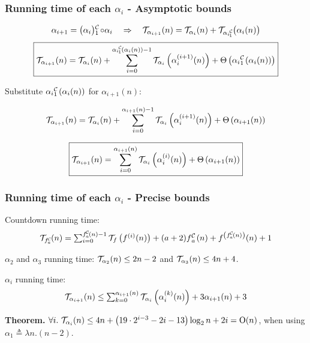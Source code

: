 \begin{frame}
\frametitle{Running time of each $\alpha_i$ - Asymptotic bounds}

\begin{equation*}
\alpha_{i+1} = \cdt{\big(\alpha_i\big)}{1}\circ \alpha_i
\quad \implies \quad \runtime_{\alpha_{i+1}}(n) = \runtime_{\alpha_i}(n) + \runtime_{\cdt{\alpha_i}{1}}\big(\alpha_i(n)\big)
\end{equation*}
\begin{equation*}
\boxed{
	\runtime_{\alpha_{i+1}}(n) = \runtime_{\alpha_i}(n) + 
\sum_{i=0}^{\cdt{\alpha_i}{1}(\alpha_i(n)) - 1} \runtime_{\alpha_i}\left(\alpha_i^{(i+1)}(n)\right) + \Theta\left(\cdt{\alpha_i}{1}(\alpha_i(n)) \right)
}
\end{equation*}

Substitute $\cdt{\alpha_i}{1}(\alpha_i(n))$ for $\alpha_{i+1}(n)$:

\begin{equation*}
\mathcal{T}_{\alpha_{i+1}}(n)
  = \mathcal{T}_{\alpha_i}(n) + 
  \sum_{i=0}^{\alpha_{i+1}(n) - 1} \mathcal{T}_{\alpha_i}\left(\alpha_i^{(i+1)}(n)\right) + \Theta\left(\alpha_{i+1}(n) \right)
\end{equation*}

\begin{equation*}
\boxed{\mathcal{T}_{\alpha_{i+1}}(n)
	= \sum_{i=0}^{\alpha_{i+1}(n)} \mathcal{T}_{\alpha_i}\left(\alpha_i^{(i)}(n)\right) + \Theta\left(\alpha_{i+1}(n) \right)}
\end{equation*}

\end{frame}


\begin{frame}
\frametitle{Running time of each $\alpha_i$ - Precise bounds}

Countdown running time:
\begin{equation*}
\textstyle \runtime_{\cdt{f}{a}}(n) =
\sum_{i=0}^{\cdt{f}{a}(n) - 1} \runtime_f\left(f^{(i)}(n)\right)
+ (a + 2)\cdt{f}{a}(n) + f^{\left(\cdt{f}{a}(n)\right)}(n) + 1
\end{equation*}

\smallskip

$\alpha_2$ and $\alpha_3$ running time: $\mathcal{T}_{\alpha_2}(n) \le 2n - 2$ and $\mathcal{T}_{\alpha_3}(n) \le 4n + 4$.

\bigskip 

$\alpha_i$ running time:
\begin{equation*}
\textstyle \mathcal{T}_{\alpha_{i+1}}(n) \le \sum_{k=0}^{\alpha_{i+1}(n)}\mathcal{T}_{\alpha_i}\left( \alpha_i^{(k)}(n)\right) + 3\alpha_{i+1}(n) + 3
\end{equation*}

\smallskip

\textbf{Theorem.} $\forall i.~\mathcal{T}_{\alpha_i}(n) \le 4n + \left(19\cdot 2^{i-3} - 2i - 13\right)\log_2n + 2i = \text{O}(n)$, when using $\alpha_1 \triangleq \lambda n. (n-2)$.

\end{frame}



